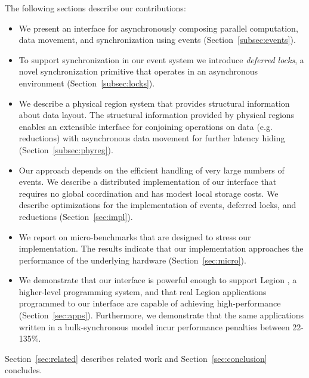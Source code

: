 The following sections describe our contributions:
\begin{itemize} \itemsep1pt \parskip0pt 
\item We present an interface for asynchronously composing
parallel computation, data movement, and synchronization using events (Section~\ref{subsec:events}).  

\item To support synchronization in our event system we introduce {\em deferred locks}, 
a novel synchronization primitive that operates in an asynchronous environment (Section~\ref{subsec:locks}).

\item We describe a physical region system that provides structural information about
data layout.  The structural information provided by physical regions enables an extensible
interface for conjoining operations on data (e.g. reductions) with asynchronous data movement for 
further latency hiding (Section~\ref{subsec:phyreg}).

\item Our approach depends on the efficient handling of very large numbers of events.
We describe a distributed implementation of our interface that requires no global coordination
and has modest local storage costs.  We describe optimizations for the implementation of events, 
deferred locks, and reductions (Section~\ref{sec:impl}).

\item We report on micro-benchmarks that are designed to stress
our implementation.  The results indicate that our implementation approaches the performance of
the underlying hardware (Section~\ref{sec:micro}).

\item We demonstrate that our interface is powerful enough to support Legion \cite{Legion12}, a higher-level
programming system, and that real Legion applications programmed to our interface
are capable of achieving high-performance (Section~\ref{sec:apps}).  Furthermore, we demonstrate
that the same applications written in a bulk-synchronous model incur performance penalties between 22-135\%.
\end{itemize}

Section~\ref{sec:related} describes related work and Section~\ref{sec:conclusion}
concludes.

